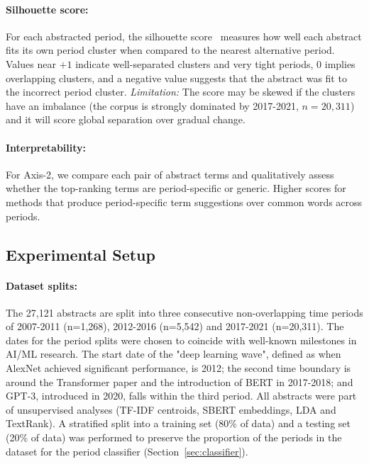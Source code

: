 \documentclass[11pt]{article}
\begin{document}
\paragraph{Silhouette score:}
For each abstracted period, the silhouette score~\cite{rousseeuw1987silhouettes} measures how well each abstract fits its own period cluster when compared to the nearest alternative period. Values near $+1$ indicate well-separated clusters and very tight periods, $0$ implies overlapping clusters, and a negative value suggests that the abstract was fit to the incorrect period cluster. \emph{Limitation:} The score may be skewed if the clusters have an imbalance (the corpus is strongly dominated by 2017-2021, $n{=}20{,}311$) and it will score global separation over gradual change.

\paragraph{Interpretability:}
For Axis-2, we compare each pair of abstract terms and qualitatively assess whether the top-ranking terms are period-specific or generic. Higher scores for methods that produce period-specific term suggestions over common words across periods.

\subsection{Experimental Setup}

\paragraph{Dataset splits:}
The 27,121 abstracts are split into three consecutive non-overlapping time periods of 2007-2011 (n=1,268), 2012-2016 (n=5,542) and 2017-2021 (n=20,311). The dates for the period splits were chosen to coincide with well-known milestones in AI/ML research. The start date of the "deep learning wave", defined as when AlexNet achieved significant performance, is 2012; the second time boundary is around the Transformer paper and the introduction of BERT in 2017-2018; and GPT-3, introduced in 2020, falls within the third period. All abstracts were part of unsupervised analyses (TF-IDF centroids, SBERT embeddings, LDA and TextRank). A stratified split into a training set (80\% of data) and a testing set (20\% of data) was performed to preserve the proportion of the periods in the dataset for the period classifier (Section~\ref{sec:classifier}).
\end{document}
